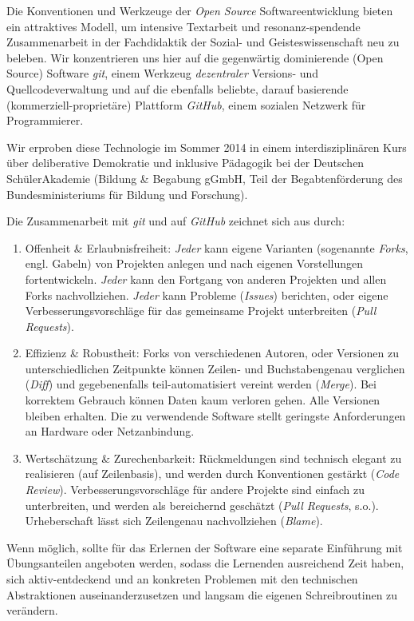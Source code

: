 \documentclass
	[
		11pt,
		a4paper,
		oneside,
		ngerman
	]
	{article}
\begin{document}
Die Konventionen und Werkzeuge der \emph{Open Source} Softwareentwicklung bieten ein attraktives Modell, um intensive Textarbeit und resonanz-spendende Zusammenarbeit in der Fachdidaktik der Sozial- und Geisteswissenschaft neu zu beleben.
Wir konzentrieren uns hier auf die gegenwärtig dominierende (Open Source) Software \emph{git}, einem Werkzeug \emph{dezentraler} Versions- und Quellcodeverwaltung und auf die ebenfalls beliebte, darauf basierende (kommerziell-proprietäre) Plattform \emph{GitHub}, einem sozialen Netzwerk für Programmierer.

Wir erproben diese Technologie im Sommer 2014 in einem interdisziplinären Kurs über deliberative Demokratie und inklusive Pädagogik bei der Deutschen SchülerAkademie (Bildung \& Begabung gGmbH, Teil der Begabtenförderung des Bundesministeriums für Bildung und Forschung).

Die Zusammenarbeit mit \emph{git} und auf \emph{GitHub} zeichnet sich aus durch:
\begin{enumerate}
	\item Offenheit \& Erlaubnisfreiheit:
		\emph{Jeder} kann eigene Varianten (sogenannte \emph{Forks}, engl. Gabeln) von Projekten anlegen und nach eigenen Vorstellungen fortentwickeln.
		\emph{Jeder} kann den Fortgang von anderen Projekten und allen Forks nachvollziehen.
		\emph{Jeder} kann Probleme (\emph{Issues}) berichten, oder eigene Verbesserungsvorschläge für das gemeinsame Projekt unterbreiten (\emph{Pull Requests}).
	\item Effizienz \& Robustheit:
		Forks von verschiedenen Autoren, oder Versionen zu unterschiedlichen Zeitpunkte können Zeilen- und Buchstabengenau verglichen (\emph{Diff}) und gegebenenfalls teil-automatisiert vereint werden (\emph{Merge}).
		Bei korrektem Gebrauch können Daten kaum verloren gehen.
		Alle Versionen bleiben erhalten.
		Die zu verwendende Software stellt geringste Anforderungen an Hardware oder Netzanbindung.
	\item Wertschätzung \& Zurechenbarkeit:
		Rückmeldungen sind technisch elegant zu realisieren (auf Zeilenbasis), und werden durch Konventionen gestärkt (\emph{Code Review}).
		Verbesserungsvorschläge für andere Projekte sind einfach zu unterbreiten, und werden als bereichernd geschätzt (\emph{Pull Requests}, s.o.).
		Urheberschaft lässt sich Zeilengenau nachvollziehen (\emph{Blame}).
\end{enumerate}

Wenn möglich, sollte für das Erlernen der Software eine separate Einführung mit Übungsanteilen angeboten werden, sodass die Lernenden ausreichend Zeit haben, sich aktiv-entdeckend und an konkreten Problemen mit den technischen Abstraktionen auseinanderzusetzen und langsam die eigenen Schreibroutinen zu verändern.
\end{document}

